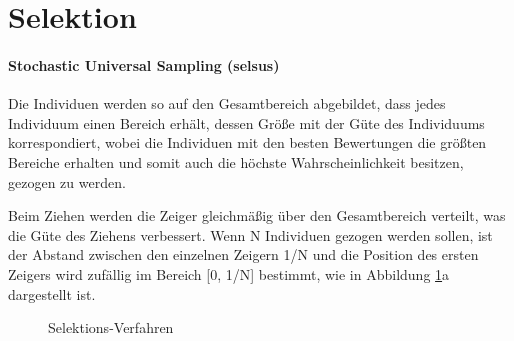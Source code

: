 \section{Selektion}\label{selection}


\paragraph{Stochastic Universal Sampling (selsus)} Die Individuen werden so auf
den Gesamtbereich abgebildet, dass jedes Individuum einen Bereich erhält, dessen
Größe mit der Güte des Individuums korrespondiert, wobei die Individuen mit den
besten Bewertungen die größten Bereiche erhalten und somit auch die höchste
Wahrscheinlichkeit besitzen, gezogen zu werden.

Beim Ziehen werden die Zeiger gleichmäßig über den Gesamtbereich verteilt, was
die Güte des Ziehens verbessert. Wenn N Individuen gezogen werden sollen, ist
der Abstand zwischen den einzelnen Zeigern 1/N und die Position des ersten
Zeigers wird zufällig im Bereich [0, 1/N] bestimmt, wie in Abbildung
\ref{fig.selection}a dargestellt ist.

\begin{figure}[!h] \centering
    \hfill
    \caption{Selektions-Verfahren \cite{mcl}}
    \label{fig.selection}
\end{figure}


